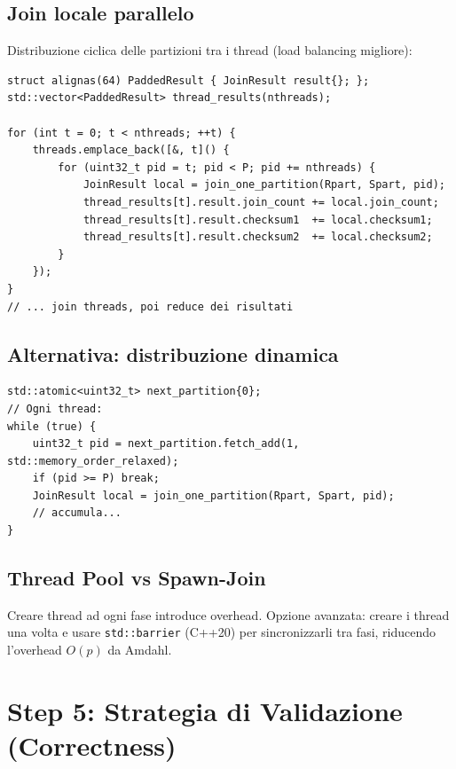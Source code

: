 \documentclass[11pt,a4paper]{article}
\begin{document}
\subsection{Join locale parallelo}

Distribuzione ciclica delle partizioni tra i thread (load balancing migliore):

\begin{lstlisting}[style=cpp,caption={Join locale con distribuzione ciclica e padding anti false-sharing}]
struct alignas(64) PaddedResult { JoinResult result{}; };
std::vector<PaddedResult> thread_results(nthreads);

for (int t = 0; t < nthreads; ++t) {
    threads.emplace_back([&, t]() {
        for (uint32_t pid = t; pid < P; pid += nthreads) {
            JoinResult local = join_one_partition(Rpart, Spart, pid);
            thread_results[t].result.join_count += local.join_count;
            thread_results[t].result.checksum1  += local.checksum1;
            thread_results[t].result.checksum2  += local.checksum2;
        }
    });
}
// ... join threads, poi reduce dei risultati
\end{lstlisting}

\subsection{Alternativa: distribuzione dinamica}

\begin{lstlisting}[style=cpp,caption={Scheduler dinamico con atomic counter}]
std::atomic<uint32_t> next_partition{0};
// Ogni thread:
while (true) {
    uint32_t pid = next_partition.fetch_add(1, std::memory_order_relaxed);
    if (pid >= P) break;
    JoinResult local = join_one_partition(Rpart, Spart, pid);
    // accumula...
}
\end{lstlisting}

\subsection{Thread Pool vs Spawn-Join}

Creare thread ad ogni fase introduce overhead. Opzione avanzata: creare i thread una volta e usare \texttt{std::barrier} (C++20) per sincronizzarli tra fasi, riducendo l'overhead $O(p)$ da Amdahl.


\section{Step 5: Strategia di Validazione (Correctness)}
\end{document}
